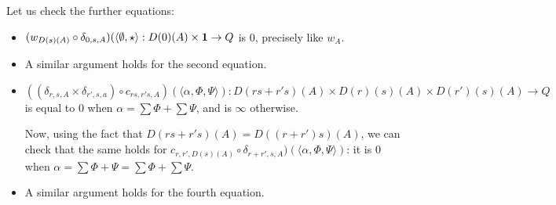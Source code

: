 Let us check the further equations:
\begin{itemize}

\item $(w_{D(s)(A)}\circ \delta_{0,s,A})(\langle \emptyset,\star\rangle: D(0)(A)\times \mathbf{1}\to Q$ is 0, precisely like $w_{A}$.

\item A similar argument holds for the second equation.

\item $((\delta_{r,s,A}\times \delta_{r',s,a})\circ c_{rs,r's,A})
(\langle \alpha, \Phi,\Psi  \rangle)
:
D(rs+r's)(A)\times  D(r)(s)(A)\times D(r')(s)(A)\to Q
$
is equal to $0$ when $\alpha=\sum \Phi + \sum \Psi$, and is $\infty$ otherwise.



Now, 
using the fact that $D(rs+r's)(A)=D((r+r')s)(A)$, we can check that the same holds for 
$c_{r,r',D(s)(A)}\circ \delta_{r+r',s,A})(\langle \alpha, \Phi,\Psi  \rangle)$: it is $0$ when 
$\alpha= \sum\Phi+\Psi= \sum \Phi+\sum \Psi$.


\item A similar argument holds for the fourth equation.

\end{itemize}



